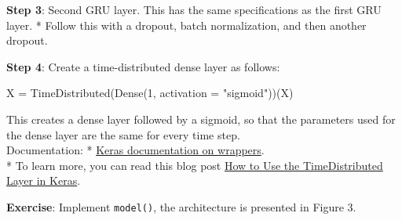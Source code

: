 \documentclass[11pt]{article}
\newenvironment{Shaded}{}{}
\newcommand{\DecValTok}[1]{\textcolor[rgb]{0.25,0.63,0.44}{{#1}}}
\newcommand{\StringTok}[1]{\textcolor[rgb]{0.25,0.44,0.63}{{#1}}}
\newcommand{\NormalTok}[1]{{#1}}
\begin{document}
\textbf{Step 3}: Second GRU layer. This has the same specifications as
the first GRU layer. * Follow this with a dropout, batch normalization,
and then another dropout.

\textbf{Step 4}: Create a time-distributed dense layer as follows:

\begin{Shaded}
\begin{Highlighting}[]
\NormalTok{X = TimeDistributed(Dense(}\DecValTok{1}\NormalTok{, activation = }\StringTok{"sigmoid"}\NormalTok{))(X)}
\end{Highlighting}
\end{Shaded}

This creates a dense layer followed by a sigmoid, so that the parameters
used for the dense layer are the same for every time
step.\\Documentation: * \href{https://keras.io/layers/wrappers/}{Keras
documentation on wrappers}.\\* To learn more, you can read this blog
post
\href{https://machinelearningmastery.com/timedistributed-layer-for-long-short-term-memory-networks-in-python/}{How
to Use the TimeDistributed Layer in Keras}.

\textbf{Exercise}: Implement \texttt{model()}, the architecture is
presented in Figure 3.
\end{document}
